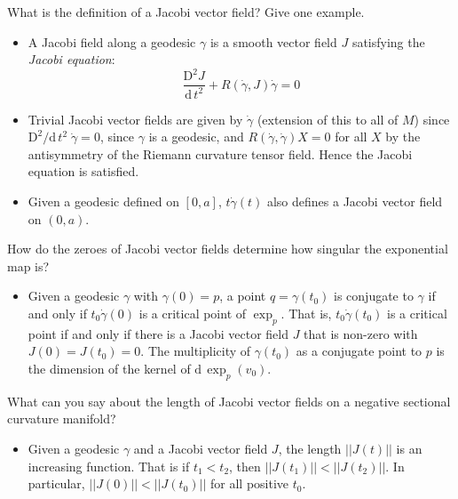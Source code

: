 \documentclass{beamer}
\begin{document}
    \begin{frame}
        What is the definition of a Jacobi vector field? Give one example.
        \begin{itemize}
            \item A Jacobi field along a geodesic $\gamma$ is a smooth vector
                field $J$ satisfying the \textit{Jacobi equation}:
                \begin{equation}
                    \frac{\textrm{D}^{2}J}{\textrm{d}\,t^{2}}+
                        R(\dot{\gamma},J)\dot{\gamma}=0
                \end{equation}
            \item Trivial Jacobi vector fields are given by $\dot{\gamma}$
                (extension of this to all of $M$) since
                $\textrm{D}^{2}/\textrm{d}\,t^{2}\;\dot{\gamma}=0$, since
                $\gamma$ is a geodesic, and $R(\dot{\gamma},\dot{\gamma})X=0$
                for all $X$ by the antisymmetry of the Riemann curvature
                tensor field. Hence the Jacobi equation is satisfied.
            \item Given a geodesic defined on $[0,a]$,
                $t\dot{\gamma}(t)$ also defines a Jacobi vector field on
                $(0,a)$.
        \end{itemize}
    \end{frame}
    \begin{frame}
        How do the zeroes of Jacobi vector fields determine how
        singular the exponential map is?
        \begin{itemize}
            \item Given a geodesic $\gamma$ with $\gamma(0)=p$, a point
                $q=\gamma(t_{0})$ is conjugate to $\gamma$ if and only if
                $t_{0}\dot{\gamma}(0)$ is a critical point of
                $\exp_{p}$. That is, $t_{0}\dot{\gamma}(t_{0})$ is a critical
                point if and only if there is a Jacobi vector field $J$ that is
                non-zero with $J(0)=J(t_{0})=0$. The multiplicity of
                $\gamma(t_{0})$ as a conjugate point to $p$ is the dimension
                of the kernel of $\textrm{d}\,\exp_{p}(v_{0})$.
        \end{itemize}
    \end{frame}
    \begin{frame}
        What can you say about the length of Jacobi vector fields on a
        negative sectional curvature manifold?
        \begin{itemize}
            \item Given a geodesic $\gamma$ and a Jacobi vector field
                $J$, the length $||J(t)||$ is an increasing function. That is
                if $t_{1}<t_{2}$, then $||J(t_{1})||<||J(t_{2})||$.
                In particular, $||J(0)||<||J(t_{0})||$ for all positive $t_{0}$.
        \end{itemize}
    \end{frame}
\end{document}
